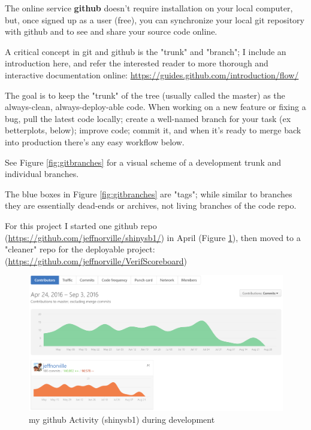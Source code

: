 \documentclass[logos,parttoc,morelanguage=french,morelanguage=german]{orsay-memoire}
\begin{document}
The online service \textbf{github} doesn't require installation on your local computer, but, once signed up as a user (free), you can synchronize your local git repository with github and to see and share your source code online.

A critical concept in git and github is the "trunk" and "branch"; I include an introduction here, and refer the interested reader to more thorough and interactive documentation online: 
\href{https://guides.github.com/introduction/flow/}{https://guides.github.com/introduction/flow/}

The goal is to keep the "trunk" of the tree (usually called the master) as the always-clean, always-deploy-able code. When working on a new feature or fixing a bug, pull the latest code locally; create a well-named branch for your task (ex betterplots, below); improve code; commit it, and when it's ready to merge back into production there's any easy workflow below.

See Figure \ref{fig:gitbranches} for a visual scheme of a development trunk and individual branches. 


The blue boxes in Figure \ref{fig:gitbranches} are "tags"; while similar to branches they are essentially dead-ends or archives, not living branches of the code repo.

For this project I started one github repo (\href{https://github.com/jeffnorville/shinysb1/}{https://github.com/jeffnorville/shinysb1/}) in April (Figure \ref{fig:githubactivity}), then moved to a "cleaner" repo for the deployable project: (\href{https://github.com/jeffnorville/VerifScoreboard}{https://github.com/jeffnorville/VerifScoreboard})

\begin{figure}[H]
\centering
\includegraphics[width=0.8\linewidth]{images/githPlotCommitActivity.png}
  \caption{my github Activity (shinysb1) during development}
  \label{fig:githubactivity}
\end{figure}
\end{document}
